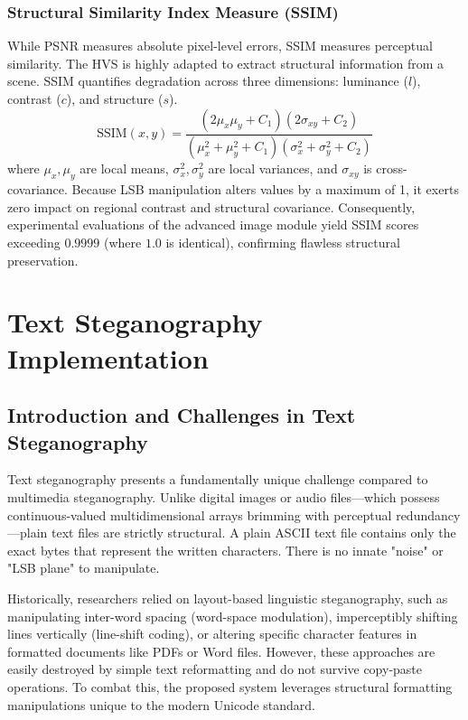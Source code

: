 \documentclass[12pt,a4paper]{report}
\begin{document}
\subsection{Structural Similarity Index Measure (SSIM)}
While PSNR measures absolute pixel-level errors, SSIM measures perceptual similarity. The HVS is highly adapted to extract structural information from a scene. SSIM quantifies degradation across three dimensions: luminance ($l$), contrast ($c$), and structure ($s$).
\begin{equation}
    \text{SSIM}(x,y) = \frac{(2\mu_x\mu_y + C_1)(2\sigma_{xy} + C_2)}{(\mu_x^2 + \mu_y^2 + C_1)(\sigma_x^2 + \sigma_y^2 + C_2)}
\end{equation}
where $\mu_x, \mu_y$ are local means, $\sigma_x^2, \sigma_y^2$ are local variances, and $\sigma_{xy}$ is cross-covariance. 
Because LSB manipulation alters values by a maximum of 1, it exerts zero impact on regional contrast and structural covariance. Consequently, experimental evaluations of the advanced image module yield SSIM scores exceeding $0.9999$ (where $1.0$ is identical), confirming flawless structural preservation.
\chapter{Text Steganography Implementation}

\section{Introduction and Challenges in Text Steganography}
Text steganography presents a fundamentally unique challenge compared to multimedia steganography. Unlike digital images or audio files—which possess continuous-valued multidimensional arrays brimming with perceptual redundancy—plain text files are strictly structural. A plain ASCII text file contains only the exact bytes that represent the written characters. There is no innate "noise" or "LSB plane" to manipulate. 

Historically, researchers relied on layout-based linguistic steganography, such as manipulating inter-word spacing (word-space modulation), imperceptibly shifting lines vertically (line-shift coding), or altering specific character features in formatted documents like PDFs or Word files. However, these approaches are easily destroyed by simple text reformatting and do not survive copy-paste operations. To combat this, the proposed system leverages structural formatting manipulations unique to the modern Unicode standard.
\end{document}
